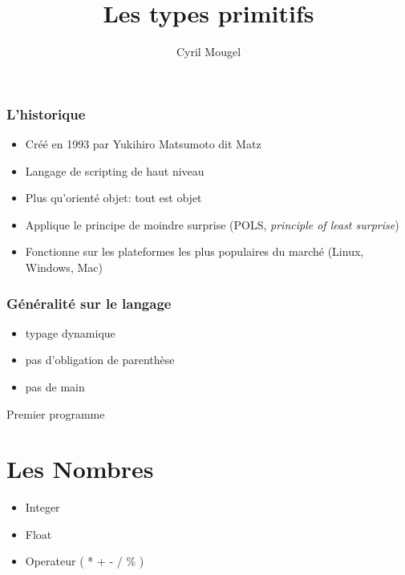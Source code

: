 \documentclass{beamer}
\title{Les types primitifs}
\author{Cyril Mougel}
\begin{document}
\begin{frame}
  \titlepage
\end{frame}

\Large{}

\begin{frame}
	\frametitle{L'historique}
	\begin{itemize}
		\item Créé en 1993 par Yukihiro Matsumoto dit \og{}Matz\fg{}
		\item Langage de scripting de haut niveau
		\item Plus qu'orienté objet: tout est objet
        \item Applique le principe de moindre surprise (POLS, \emph{principle of
                least surprise})
        \item Fonctionne sur les plateformes les plus populaires du marché (Linux, Windows,
                Mac)
	\end{itemize}
\end{frame}

\begin{frame}
  \frametitle{G\'en\'eralit\'e sur le langage}
  \begin{itemize}
    \item typage dynamique
    \item pas d'obligation de parenthèse
    \item pas de main
  \end{itemize}
\end{frame}

\begin{frame}
  \begin{beamerboxesrounded}{Premier programme}
    
  \end{beamerboxesrounded}
\end{frame}

\section{Les Nombres}

\begin{frame}
  \begin{itemize}
    \item Integer
    \item Float
    \item Operateur ( * + - / \% )
  \end{itemize}
\end{frame}
\end{document}
